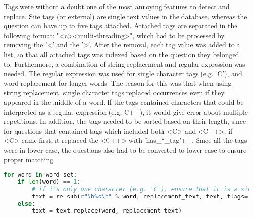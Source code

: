 \vspace{0.5em}\newline
Tags were without a doubt one of the most annoying features to detect and replace. 
Site tags (or external) are single text values in the database, whereas the question can have up to five tags attached. 
Attached tags are separated in the following format: "<c><multi-threading>", which had to be processed by removing the '<' and the '>'.
After the removal, each tag value was added to a list, so that all attached tags was indexed based on the question they belonged to. 
Furthermore, a combination of string replacement and regular expression was needed. 
The regular expression was used for single character tags (e.g. 'C'), and word replacement for longer words.
The reason for this was that when using string replacement, single character tags replaced occurrences even if they appeared in the middle of a word.
If the tags contained characters that could be interpreted as a regular expression (e.g. C++), it would give error about multiple repetitions.
In addition, the tags needed to be sorted based on their length, since for questions that contained tags which included both <C> and <C++>, 
if <C> came first, it replaced the <C++> with 'has\_*\_tag'++. 
Since all the tags were in lower-case, the questions also had to be converted to lower-case to ensure proper matching.

\begin{lstlisting}[caption={Replacing tags in the question}, 
label={lst:pandas_categorical}, language={Python}, basicstyle=\small] 
for word in word_set:
	if len(word) == 1:
		# if its only one character (e.g. 'C'), ensure that it is a singular word by using regex
		text = re.sub(r"\b%s\b" % word, replacement_text, text, flags=re.IGNORECASE)
	else:
		text = text.replace(word, replacement_text)
\end{lstlisting}

